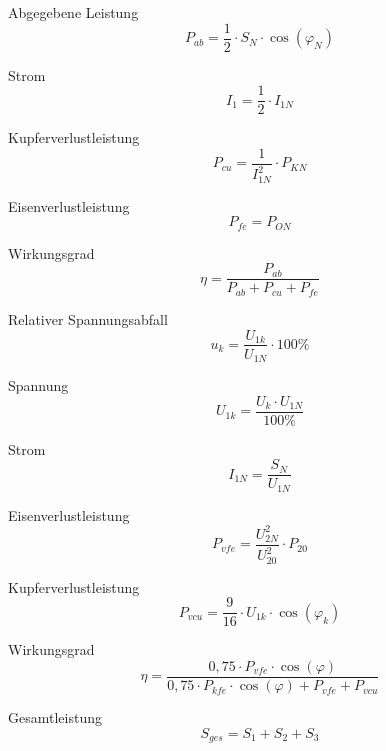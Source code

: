 \documentclass[11pt, a4paper, draft, fleqn, twocolumn]{article}
\numberwithin{equation}{subsection}
\begin{document}
Abgegebene Leistung
\begin{equation}
    P_{ab} = \frac{1}{2} \cdot S_N \cdot \cos(\varphi_N)
\end{equation}

\noindent Strom
\begin{equation}
    I_1 = \frac{1}{2} \cdot I_{1N}
\end{equation}

\noindent Kupferverlustleistung
\begin{equation}
    P_{cu} = \frac{1}{I_{1N}^2} \cdot P_{KN}
\end{equation}

\noindent Eisenverlustleistung
\begin{equation}
    P_{fe} = P_{ON}
\end{equation}

\noindent Wirkungsgrad
\begin{equation}
    \eta = \frac{P_{ab}}{P_{ab} + P_{cu} + P_{fe}}
\end{equation}

\noindent Relativer Spannungsabfall
\begin{equation}
    u_k = \frac{U_{1k}}{U_{1N}} \cdot 100\%
\end{equation}

\noindent Spannung
\begin{equation}
    U_{1k} = \frac{U_k \cdot U_{1N}}{100\%}
\end{equation}

\noindent Strom
\begin{equation}
    I_{1N} = \frac{S_N}{U_{1N}}
\end{equation}

\noindent Eisenverlustleistung
\begin{equation}
    P_{vfe} = \frac{U_{2N}^2}{U_{20}^2} \cdot P_{20}
\end{equation}

\noindent Kupferverlustleistung
\begin{equation}
    P_{vcu} = \frac{9}{16} \cdot U_{1k} \cdot \cos(\varphi_k)
\end{equation}

\noindent Wirkungsgrad
\begin{equation}
    \eta = \frac{0,75 \cdot P_{vfe} \cdot \cos(\varphi)}{0,75 \cdot P_{kfe} \cdot \cos(\varphi) + P_{vfe} + P_{vcu}}
\end{equation}

\noindent Gesamtleistung
\begin{equation}
    S_{ges} = S_1 + S_2 + S_3
\end{equation}
\end{document}
